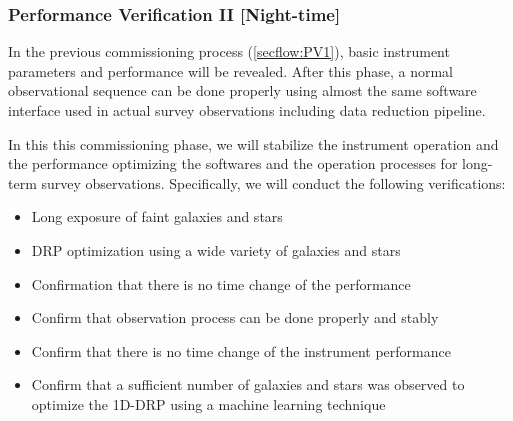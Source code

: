 \subsubsection{Performance Verification II [Night-time]}\label{secflow:PV2}

In the previous commissioning process (\ref{secflow:PV1}), basic instrument parameters and performance will be revealed. After this phase, a normal observational sequence can be done properly using almost the same software interface used in actual survey observations including data reduction pipeline. 

In this this commissioning phase, we will stabilize the instrument operation and the performance optimizing the softwares and the operation processes for long-term survey observations. Specifically, we will conduct the following verifications:

\begin{itemize}
\item Long exposure of faint galaxies and stars
\item DRP optimization using a wide variety of galaxies and stars 
\item Confirmation that there is no time change of the performance
\end{itemize}



\begin{itembox}[l]{}
\begin{itemize}
\item Confirm that observation process can be done properly and stably
\item Confirm that there is no time change of the instrument performance
\item Confirm that a sufficient number of galaxies and stars was observed to optimize the 1D-DRP using a machine learning technique
\end{itemize}
\end{itembox}


